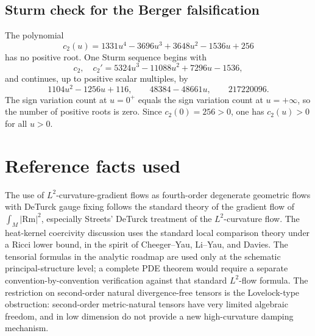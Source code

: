 \documentclass[11pt]{amsart}
\newcommand{\Rm}{\mathrm{Rm}}
\begin{document}
\subsection{Sturm check for the Berger falsification}

The polynomial
\[
        c_2(u)=1331u^4-3696u^3+3648u^2-1536u+256
\]
has no positive root.  One Sturm sequence begins with
\[
        c_2,\quad
        c_2'=5324u^3-11088u^2+7296u-1536,
\]
and continues, up to positive scalar multiples, by
\[
        1104u^2-1256u+116,\qquad
        48384-48661u,\qquad
        217220096 .
\]
The sign variation count at \(u=0^+\) equals the sign variation count at
\(u=+\infty\), so the number of positive roots is zero.  Since
\(c_2(0)=256>0\), one has \(c_2(u)>0\) for all \(u>0\).


\section{Reference facts used}

The use of \(L^2\)-curvature-gradient flows as fourth-order degenerate
geometric flows with DeTurck gauge fixing follows the standard theory of the
gradient flow of \(\int_M |\Rm|^2\), especially Streets' DeTurck treatment of
the \(L^2\)-curvature flow.  The heat-kernel coercivity discussion uses the
standard local comparison theory under a Ricci lower bound, in the spirit of
Cheeger--Yau, Li--Yau, and Davies.  The tensorial formulas in the analytic roadmap are
used only at the schematic principal-structure level; a complete PDE theorem
would require a separate convention-by-convention verification against that
standard \(L^2\)-flow formula.  The restriction on second-order natural
divergence-free tensors is the Lovelock-type obstruction: second-order
metric-natural tensors have very limited algebraic freedom, and in low
dimension do not provide a new high-curvature damping mechanism.
\end{document}
